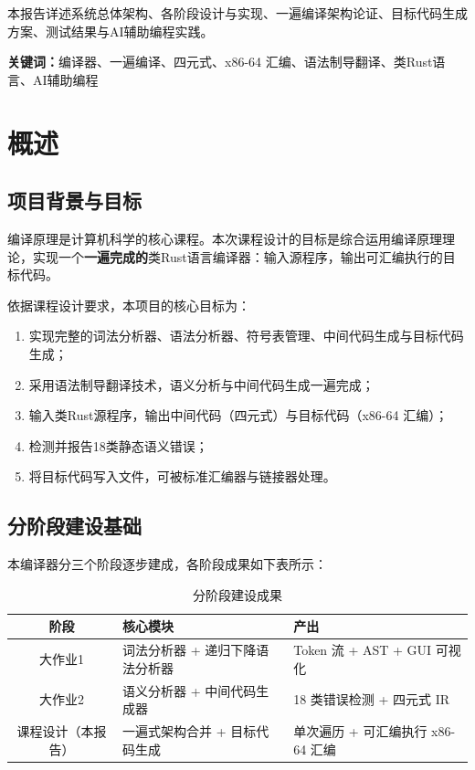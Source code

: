 \documentclass[12pt,a4paper]{ctexart}
\begin{document}
本报告详述系统总体架构、各阶段设计与实现、一遍编译架构论证、目标代码生成方案、测试结果与AI辅助编程实践。

\textbf{关键词：}编译器、一遍编译、四元式、x86-64 汇编、语法制导翻译、类Rust语言、AI辅助编程

\newpage

\section{概述}

\subsection{项目背景与目标}

编译原理是计算机科学的核心课程。本次课程设计的目标是综合运用编译原理理论，实现一个\textbf{一遍完成的}类Rust语言编译器：输入源程序，输出可汇编执行的目标代码。

依据课程设计要求，本项目的核心目标为：
\begin{enumerate}
    \item 实现完整的词法分析器、语法分析器、符号表管理、中间代码生成与目标代码生成；
    \item 采用语法制导翻译技术，语义分析与中间代码生成一遍完成；
    \item 输入类Rust源程序，输出中间代码（四元式）与目标代码（x86-64 汇编）；
    \item 检测并报告18类静态语义错误；
    \item 将目标代码写入文件，可被标准汇编器与链接器处理。
\end{enumerate}

\subsection{分阶段建设基础}

本编译器分三个阶段逐步建成，各阶段成果如下表所示：

\begin{table}[H]
\centering
\caption{分阶段建设成果}
\small
\begin{tabular}{|c|p{3.5cm}|p{5.5cm}|}
\hline
\textbf{阶段} & \textbf{核心模块} & \textbf{产出} \\
\hline
大作业1 & 词法分析器 + 递归下降语法分析器 & Token 流 + AST + GUI 可视化 \\
\hline
大作业2 & 语义分析器 + 中间代码生成器 & 18 类错误检测 + 四元式 IR \\
\hline
课程设计（本报告） & 一遍式架构合并 + 目标代码生成 & 单次遍历 + 可汇编执行 x86-64 汇编 \\
\hline
\end{tabular}
\normalsize
\end{table}
\end{document}
